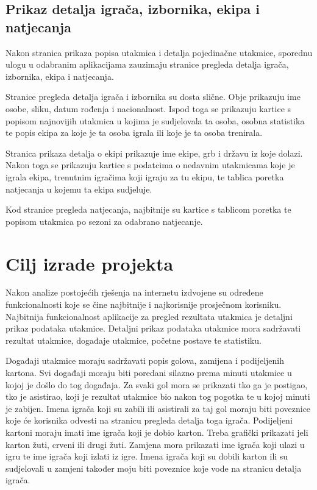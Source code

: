 \documentclass[times, utf8, zavrsni]{fer}
\begin{document}
\section{Prikaz detalja igrača, izbornika, ekipa i natjecanja}

Nakon stranica prikaza popisa utakmica i detalja pojedinačne utakmice, sporednu ulogu u odabranim aplikacijama zauzimaju stranice pregleda detalja igrača, izbornika, ekipa i natjecanja.

Stranice pregleda detalja igrača i izbornika su dosta slične. Obje prikazuju ime osobe, sliku, datum rođenja i nacionalnost.
Ispod toga se prikazuju kartice s popisom najnovijih utakmica u kojima je sudjelovala ta osoba, osobna statistika te popis ekipa za koje je ta osoba igrala ili koje je ta osoba trenirala.

Stranica prikaza detalja o ekipi prikazuje ime ekipe, grb i državu iz koje dolazi. Nakon toga se prikazuju kartice s podatcima o nedavnim utakmicama koje je igrala ekipa,
trenutnim igračima koji igraju za tu ekipu, te tablica poretka natjecanja u kojemu ta ekipa sudjeluje.

Kod stranice pregleda natjecanja, najbitnije su kartice s tablicom poretka te popisom utakmica po sezoni za odabrano natjecanje.

\chapter{Cilj izrade projekta}

Nakon analize postojećih rješenja na internetu izdvojene su određene funkcionalnosti koje se čine najbitnije i najkorisnije prosječnom korisniku.
Najbitnija funkcionalnost aplikacije za pregled rezultata utakmica je detaljni prikaz podataka utakmice.
Detaljni prikaz podataka utakmice mora sadržavati rezultat utakmice, događaje utakmice, početne postave te statistiku.

Događaji utakmice moraju sadržavati popis golova, zamijena i podijeljenih kartona. Svi događaji moraju biti poredani silazno prema minuti utakmice u kojoj je došlo do tog događaja.
Za svaki gol mora se prikazati tko ga je postigao, tko je asistirao, koji je rezultat utakmice bio nakon tog pogotka te u kojoj minuti je zabijen.
Imena igrača koji su zabili ili asistirali za taj gol moraju biti poveznice koje će korisnika odvesti na stranicu pregleda detalja toga igrača.
Podijeljeni kartoni moraju imati ime igrača koji je dobio karton. Treba grafički prikazati jeli karton žuti, crveni ili drugi žuti.
Zamjena mora prikazati ime igrača koji ulazi u igru te ime igrača koji izlati iz igre.
Imena igrača koji su dobili karton ili su sudjelovali u zamjeni također moju biti poveznice koje vode na stranicu detalja igrača.
\end{document}

